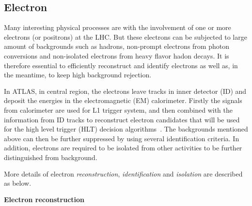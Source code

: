 \subsection{Electron}
\label{sec:electron}

Many interesting physical processes are with the involvement of one or more electrons (or positrons) at the LHC.
But these electrons can be subjected to large amount of backgrounds such as hadrons, non-prompt electrons from photon conversions and non-isolated electrons from heavy flavor hadon decays.
It is therefore essential to efficiently reconstruct and identify electrons as well as, in the meantime, to keep high background rejection.

In ATLAS, in central region, the electrons leave tracks in inner detector (ID) and deposit the energies in the electromagnetic (EM) calorimeter. 
Firstly the signals from calorimeter are used for L1 trigger system, and then combined with the information from ID tracks to reconstruct electron candidates that will be used for the high level trigger (HLT) decision algorithms~\cite{ATLAS-CONF-2016-024}.
The backgrounds mentioned above can then be further suppressed by using several identification criteria.
In addition, electrons are required to be isolated from other activities to be further distinguished from background.

More details of electron \textit{reconstruction}, \textit{identification} and \textit{isolation} are described as below.

\textbf{Electron reconstruction} 

